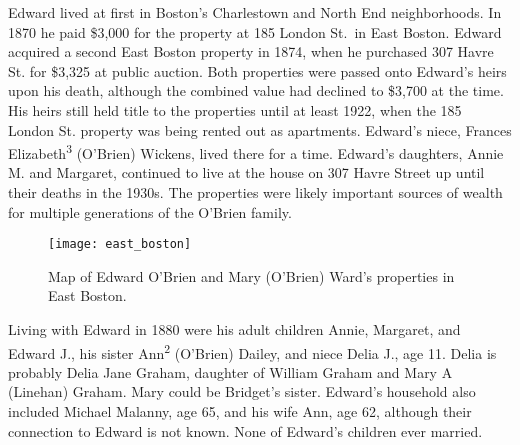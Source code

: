 Edward lived at first in Boston's Charlestown\cite{MaryAnn3OBrienBirth:1} and North End\cite{Edward3OBrienBirth:1} neighborhoods. In 1870 he paid \$3,000 for the property at 185 London St.\ in East Boston.\cite{LondonStDeed:2} Edward acquired a second East Boston property in 1874, when he purchased 307 Havre St. for \$3,325 at public auction.\cite{HavrePurchase} Both properties were passed onto Edward's heirs upon his death, although the combined value had declined to \$3,700 at the time.\cite{Edward2OBrienProbate} His heirs still held title to the properties until at least 1922,\cite{Bromley1922} when the 185 London St. property was being rented out as apartments.\cite{GlobeRobbery} Edward's niece, Frances Elizabeth\textsuperscript{3} (O'Brien) Wickens, lived there for a time.\cite{Frances3OBrien1914} Edward's daughters, Annie M. and Margaret, continued to live at the house on 307 Havre Street up until their deaths in the 1930s.\cite{AnnMaria3OBrienDeath:1} The properties were likely important sources of wealth for multiple generations of the O'Brien family.

\begin{figure}[htbp]
	\centering
	\texttt{[image: east\_boston]}
	\caption{Map of Edward O'Brien and Mary (O'Brien) Ward's properties in East Boston.}
	\label{fig:EastBoston}
\end{figure}

Living with Edward in 1880 were his adult children Annie, Margaret, and Edward J., his sister Ann\textsuperscript{2} (O'Brien) Dailey, and niece Delia J., age 11.\cite{Census1880Edward:2} Delia is probably Delia Jane Graham, daughter of William Graham and Mary A (Linehan) Graham.\cite{DeliaGrahamBirth} Mary could be Bridget's sister. Edward's household also included Michael Malanny, age 65, and his wife Ann, age 62, although their connection to Edward is not known.\cite{Census1880Edward:3} None of Edward's children ever married. 

